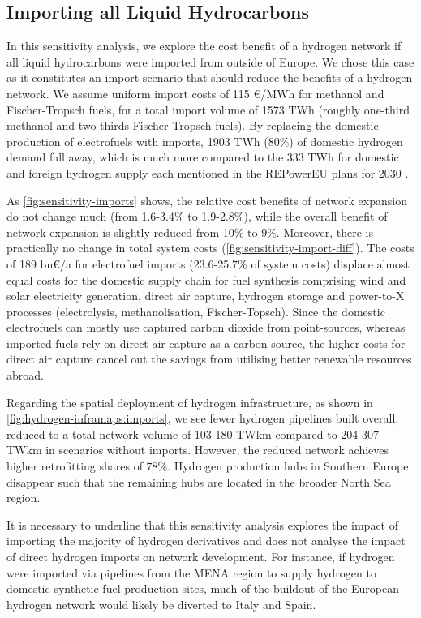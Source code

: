 \subsection{Importing all Liquid Hydrocarbons}
\label{sec:si:sensitivity-imports}

In this sensitivity analysis, we explore the cost benefit of a hydrogen network
if all liquid hydrocarbons were imported from outside of Europe. We chose this
case as it constitutes an import scenario that should reduce the
benefits of a hydrogen network. We assume uniform import costs of 115
\euro/MWh  for
methanol and Fischer-Tropsch fuels, for a total import volume of 1573 TWh
(roughly one-third methanol and two-thirds Fischer-Tropsch fuels). By replacing the
domestic production of electrofuels with imports, 1903 TWh (80\%) of domestic
hydrogen demand fall away, which is much more compared to the 333 TWh for
domestic and foreign hydrogen supply each mentioned in the REPowerEU plans for
2030 .

As \cref{fig:sensitivity-imports} shows, the relative cost benefits of network
expansion do not change much (from 1.6-3.4\% to 1.9-2.8\%), while the overall
benefit of network expansion is slightly reduced from 10\% to 9\%. Moreover,
there is practically no change in total system costs
(\cref{fig:sensitivity-import-diff}). The costs of 189 bn\euro/a for electrofuel
imports (23.6-25.7\% of system costs) displace almost equal costs for the
domestic supply chain for fuel synthesis comprising wind and solar electricity
generation, direct air capture, hydrogen storage and power-to-X processes
(electrolysis, methanolisation, Fischer-Topsch). Since the domestic electrofuels
can mostly use captured carbon dioxide from point-sources, whereas imported
fuels rely on direct air capture as a carbon source, the higher costs for direct
air capture cancel out the savings from utilising better renewable resources
abroad.

Regarding the spatial deployment of hydrogen infrastructure, as shown in
\cref{fig:hydrogen-inframaps:imports}, we see fewer hydrogen pipelines built
overall, reduced to a total network volume of 103-180 TWkm compared to 204-307
TWkm in scenarios without imports. However, the reduced network achieves higher
retrofitting shares of 78\%. Hydrogen production hubs in Southern Europe
disappear such that the remaining hubs are located in the broader North Sea region.

It is necessary to underline that this sensitivity analysis explores the impact
of importing the majority of hydrogen derivatives and does not analyse the
impact of direct hydrogen imports on network development. For instance, if
hydrogen were imported via pipelines from the MENA region to supply hydrogen to
domestic synthetic fuel production sites, much of the buildout of the European
hydrogen network would likely be diverted to Italy and Spain.

